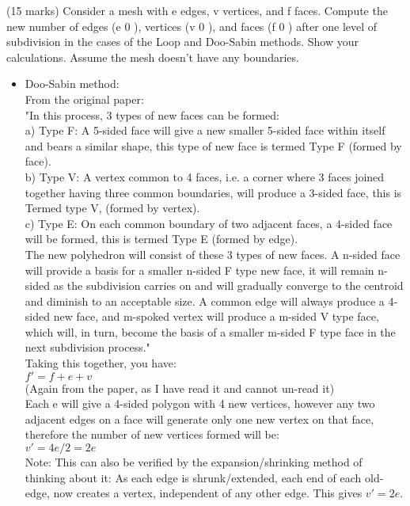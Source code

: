 (15 marks) Consider a mesh with e edges, v vertices, and f faces. Compute the new number
of edges (e 0 ), vertices (v 0 ), and faces (f 0 ) after one level of subdivision in the cases of the
Loop and Doo-Sabin methods. Show your calculations. Assume the mesh doesn’t have any
boundaries.
\begin{itemize}
\item Doo-Sabin method: \\
From the original paper: \\
"In this process, 3 types of new faces can be formed: \\
a) Type F: A 5-sided face will give a new smaller 5-sided face within itself and bears a similar shape, this type of new face is termed Type F (formed by face). \\
b) Type V: A vertex common to 4 faces, i.e. a corner where 3 faces joined together having three common boundaries, will produce a 3-sided face, this is Termed type V, (formed by vertex). \\
c) Type E: On each common boundary of two adjacent faces, a 4-sided face will be formed, this is termed Type E (formed by edge). \\

  The new polyhedron will consist of these 3 types of new faces. A n-sided face will provide a basis for a smaller n-sided F type new face, it will remain n-sided as the subdivision carries on and will gradually converge to the centroid and diminish to an acceptable size. A common edge will always produce a 4-sided new face, and m-spoked vertex will produce a m-sided V type face, which will, in turn, become the basis of a smaller m-sided F type face in the next subdivision process." \\

Taking this together, you have: \\
$f' = f + e + v$ \\

(Again from the paper, as I have read it and cannot un-read it) \\
Each e will give a 4-sided polygon with 4 new vertices, however any two adjacent edges on a face will generate only one new vertex on that face, therefore the number of new vertices formed will be: \\
$v' = 4 e / 2 = 2e$ \\
Note: This can also be verified by the expansion/shrinking method of thinking about it: As each edge is shrunk/extended, each end of each old-edge, now creates a vertex, independent of any other edge. This gives $v' = 2e$. \\


\end{itemize}
